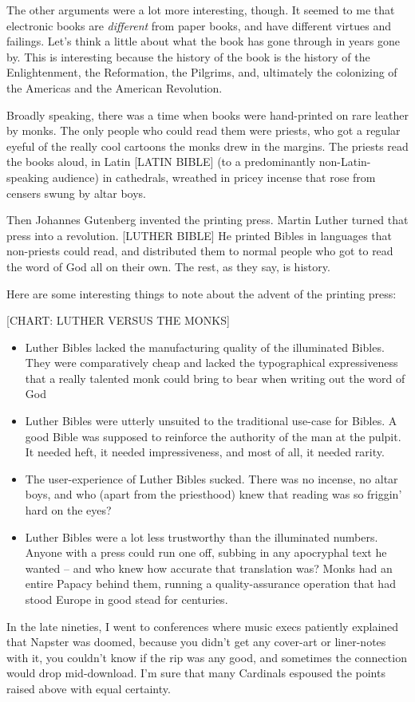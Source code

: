 The other arguments were a lot more interesting, though. It seemed
to me that electronic books are \emph{different} from paper
books, and have different virtues and failings. Let's think a
little about what the book has gone through in years gone by. This
is interesting because the history of the book is the history of
the Enlightenment, the Reformation, the Pilgrims, and, ultimately
the colonizing of the Americas and the American Revolution.

Broadly speaking, there was a time when books were hand-printed on
rare leather by monks. The only people who could read them were
priests, who got a regular eyeful of the really cool cartoons the
monks drew in the margins. The priests read the books aloud, in
Latin [LATIN BIBLE] (to a predominantly non-Latin-speaking
audience) in cathedrals, wreathed in pricey incense that rose from
censers swung by altar boys.

Then Johannes Gutenberg invented the printing press. Martin Luther
turned that press into a revolution. [LUTHER BIBLE] He printed
Bibles in languages that non-priests could read, and distributed
them to normal people who got to read the word of God all on their
own. The rest, as they say, is history.

Here are some interesting things to note about the advent of the
printing press:

[CHART: LUTHER VERSUS THE MONKS]

\begin{itemize}
\item
  Luther Bibles lacked the manufacturing quality of the illuminated
  Bibles. They were comparatively cheap and lacked the typographical
  expressiveness that a really talented monk could bring to bear when
  writing out the word of God
\item
  Luther Bibles were utterly unsuited to the traditional use-case for
  Bibles. A good Bible was supposed to reinforce the authority of the
  man at the pulpit. It needed heft, it needed impressiveness, and
  most of all, it needed rarity.
\item
  The user-experience of Luther Bibles sucked. There was no incense,
  no altar boys, and who (apart from the priesthood) knew that
  reading was so friggin' hard on the eyes?
\item
  Luther Bibles were a lot less trustworthy than the illuminated
  numbers. Anyone with a press could run one off, subbing in any
  apocryphal text he wanted -- and who knew how accurate that
  translation was? Monks had an entire Papacy behind them, running a
  quality-assurance operation that had stood Europe in good stead for
  centuries.
\end{itemize}
In the late nineties, I went to conferences where music execs
patiently explained that Napster was doomed, because you didn't get
any cover-art or liner-notes with it, you couldn't know if the rip
was any good, and sometimes the connection would drop mid-download.
I'm sure that many Cardinals espoused the points raised above with
equal certainty.

